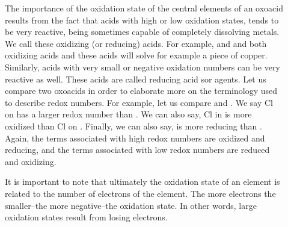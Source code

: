 \documentclass[main.tex]{subfiles}
\begin{document}
\begin{description}
\item[]    
The importance of the oxidation state of the central elements of an oxoacid results from the fact that acids with high or low oxidation states, tends to be very reactive, being sometimes capable of completely dissolving metals. We call these oxidizing (or reducing) acids. For example,  and  and both oxidizing acids and these acids will solve for example a piece of copper. Similarly, acids with very small or negative oxidation numbers can be very reactive as well. These acids are called reducing acid sor agents.
Let us compare two oxoacids in order to elaborate more on the terminology used to describe redox numbers. For example, let us compare  and . 
We say  Cl on  has a larger redox number than . We can also say, Cl in  is more oxidized than Cl on . 
Finally, we can also say,  is more reducing than . Again, the terms associated with high redox numbers are oxidized and reducing, and the terms associated with low redox numbers are reduced and oxidizing.

It is important to note that ultimately the oxidation state of an element is related to the number of electrons of the element. The more electrons the smaller--the more negative--the oxidation state. In other words, large oxidation states result from losing electrons.


\end{description}
\end{document}
